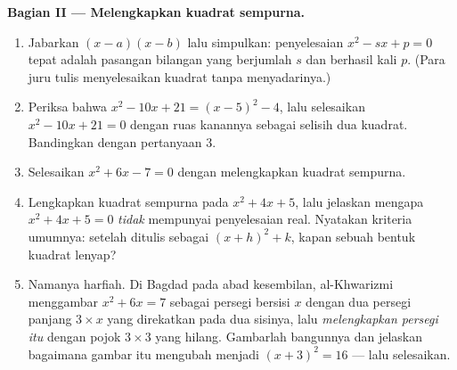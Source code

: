 \begin{problem}[{Soal akhir pekan --- soal jumlah-dan-hasil-kali,
melengkapkan kuadrat sempurna sebagaimana digambar al-Khwarizmi, dan
persamaan $x^2 = x + 1$}]
\medskip
\noindent\textbf{Bagian II --- Melengkapkan kuadrat sempurna.}
\begin{enumerate}[resume]
  \item Jabarkan $(x - a)(x - b)$ lalu simpulkan: penyelesaian
        $x^2 - sx + p = 0$ tepat adalah pasangan bilangan yang
        berjumlah $s$ dan berhasil kali $p$. (Para juru tulis
        menyelesaikan  kuadrat tanpa menyadarinya.)
  \item Periksa bahwa $x^2 - 10x + 21 = (x - 5)^2 - 4$, lalu selesaikan
        $x^2 - 10x + 21 = 0$ dengan  ruas kanannya sebagai
        selisih dua kuadrat. Bandingkan dengan pertanyaan 3.
  \item Selesaikan $x^2 + 6x - 7 = 0$ dengan melengkapkan kuadrat sempurna.
  \item Lengkapkan kuadrat sempurna pada $x^2 + 4x + 5$, lalu jelaskan
        mengapa  $x^2 + 4x + 5 = 0$ \emph{tidak} mempunyai
        penyelesaian real. Nyatakan kriteria umumnya: setelah ditulis
        sebagai $(x + h)^2 + k$, kapan sebuah bentuk kuadrat lenyap?
  \item Namanya harfiah. Di Bagdad pada abad kesembilan,
        al-Khwarizmi menggambar $x^2 + 6x = 7$ sebagai persegi bersisi $x$
        dengan dua persegi panjang $3 \times x$ yang direkatkan pada dua
        sisinya, lalu \emph{melengkapkan persegi itu} dengan pojok
        $3 \times 3$ yang hilang. Gambarlah bangunnya dan jelaskan bagaimana
        gambar itu mengubah  menjadi $(x + 3)^2 = 16$ --- lalu
        selesaikan.
\end{enumerate}


\end{problem}
